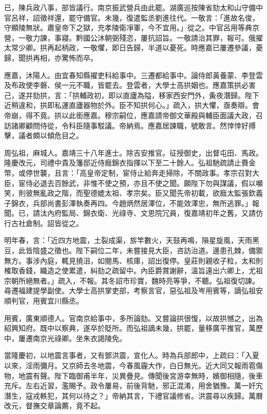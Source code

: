 \begin{pinyinscope}
{{已，陳兵政八事，部皆議行。南京振武營兵由此罷。湖廣巡按陳省劾太和山守備中官呂祥，詔徵祥還，罷守備官。未幾，復遣監丞劉進往代。一敬言：「進故名俊，守顯陵無狀。肅皇帝下之獄，充孝陵衛凈軍，今不宜用。」從之。中官呂用等典京營，一敬力諫，事寢。黔國公沐朝弼殘恣，屢抗詔旨。一敬請治其罪，報可。俄擢太常少卿。拱再起柄政，一敬懼，即日告歸，半道以憂死。時應嘉已屢遷參議，憂歸，聞拱再相，亦驚怖而卒。

應嘉，沐陽人。由宜春知縣擢吏科給事中。三遷都給事中。論侍郎黃養蒙、李登雲及布政使李磐、侯一元不職，皆罷去。登雲者，大學士高拱姻也。應嘉策拱必害己，遂并劾拱，言：「拱輔政初，即以直廬為隘，移家西安門外，夤夜潛歸。陛下近稍違和，拱即私運直廬器物於外。臣不知拱何心。」疏入，拱大懼，亟奏辯。會帝崩，得不竟。拱以此銜應嘉。穆宗嗣位，應嘉請帝御文華殿與輔臣面議大政，召訪諸卿顧問侍從，令科臣隨事駁議。帝納焉。應嘉居諫職，號敢言。然悻悻好搏擊，議者頗以傾危目之。

周弘祖，麻城人。嘉靖三十八年進士。除吉安推官。征授御史，出督屯田、馬政。隆慶改元，司禮中貴及籓邸近侍廕錦衣指揮以下至二十餘人。弘祖馳疏請止賚金幣，或停世襲，且言：「高皇帝定制，宦侍止給奔走掃除，不關政事。孝宗召對大臣，宦侍必退去百餘武，非惟不使之預，亦且不使之聞。願陛下勿與謀議，假以嚬笑，則彼無亂政之階，而聖德媲太祖、孝宗矣。臣又聞先帝初載，欲廕太監張欽義子錦衣，兵部尚書彭澤執奏再四。今趙炳然居澤位，不能效澤忠，無所逃罪。」報聞。已，請汰內府監局、錦衣衛、光祿寺、文思院冗員，復嘉靖初年之舊，又請仿行古社倉制。詔皆從之。

明年春，言：「近四方地震，土裂成渠，旂竿數火，天鼓再鳴，隕星旋風，天雨黑豆，此皆陰盛之徵也。陛下嗣位二年，未嘗接見大臣，咨訪治道。邊患孔棘，備禦無方。事涉內庭，輒見撓沮，如閱馬、核庫，詔出復停。皇莊則親收子粒，太和則榷取香錢，織造之使累遣，糾劾之疏留中。內臣爵賞謝辭，溫旨遠出六卿上，尤祖宗朝所絕無者。」疏入，不報。其冬詔市珍寶，魏時亮等爭，不聽。弘祖復切諫。尋遷福建提學副使。大學士高拱掌吏部，考察言官，惡弘祖及岑用賓等，謫弘祖安順判官，用賓宜川縣丞。

用賓，廣東順德人。官南京給事中，多所論劾。又嘗論拱很愎，以故拱憾之，出為紹興知府。既中以察典，遂卒於貶所。而弘祖謫未幾，拱罷，量移廣平推官，萬歷中，屢遷南京光祿卿。坐朱衣謁陵免。

當隆慶初，以地震言事者，又有鄧洪震，宣化人。時為兵部郎中，上疏曰：「入夏以來，淫雨彌月。又京師去冬地震，今春風霾大作，白日無光。近大同又報雨雹傷物，地震有聲。陛下臨御甫半年，災異疊見。傳聞後宮游幸無時，嬪御相隨，後車充斥。左右近習，濫賜予。政令屢易，前後背馳，邪正混淆，用舍猶豫。萬一奸宄潛生，寇戎軼犯，其何以待之？」帝納其言，下禮官議修省。洪震尋以疾歸。萬曆改元，督撫交章論薦，竟不起。

}}
\end{pinyinscope}
